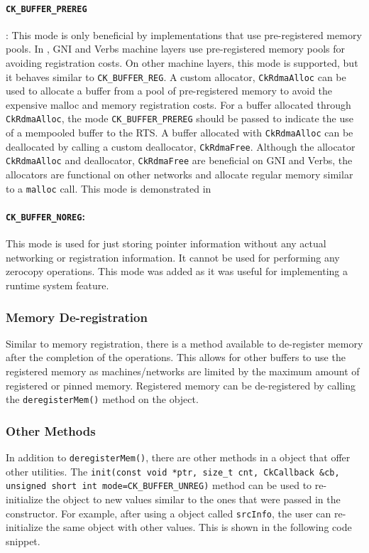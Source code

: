 \paragraph{{\tt CK\_BUFFER\_PREREG}}:
This mode is only beneficial by implementations that use pre-registered memory pools.
In \charmpp{}, GNI and Verbs machine layers use pre-registered memory pools for avoiding
registration costs. On other machine layers, this mode is supported, but it behaves similar
to {\tt CK\_BUFFER\_REG}. A custom allocator, \texttt{CkRdmaAlloc}
can be used to allocate a buffer from a pool of pre-registered memory to avoid the expensive malloc
and memory registration costs. For a buffer allocated through \texttt{CkRdmaAlloc}, the mode
{\tt CK\_BUFFER\_PREREG} should be passed to indicate the use of a
mempooled buffer to the RTS. A buffer allocated with \texttt{CkRdmaAlloc} can be deallocated by
calling a custom deallocator, \texttt{CkRdmaFree}. Although the allocator \texttt{CkRdmaAlloc} and
deallocator, \texttt{CkRdmaFree} are beneficial on GNI and Verbs, the allocators are functional on other
networks and allocate regular memory similar to a \texttt{malloc} call. This mode is demonstrated in

\paragraph{{\tt CK\_BUFFER\_NOREG}:}
This mode is used for just storing pointer information without any actual networking
or registration information. It cannot be used for performing any zerocopy operations.
This mode was added as it was useful for implementing a runtime system feature.

\subsubsection{Memory De-registration}
Similar to memory registration, there is a method available to de-register
memory after the completion of the operations. This allows for other buffers to use the
registered memory as machines/networks are limited by the maximum amount of registered or
pinned memory. Registered memory can be de-registered by calling the \texttt{deregisterMem()}
method on the  object.

\subsubsection{Other Methods}
In addition to \texttt{deregisterMem()}, there are other methods in a  object
that offer other utilities. The
{\tt init(const void *ptr, size\_t cnt, CkCallback \&cb,
unsigned short int mode=CK\_BUFFER\_UNREG)}
method can be used to re-initialize the  object to new values similar to the ones that
were passed in the constructor. For example, after using a  object called \texttt{srcInfo},
the user can re-initialize the same object with other values. This is shown in the following code snippet.

